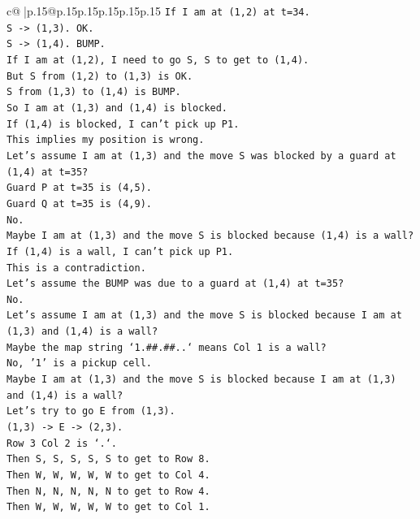 \documentclass{article}
\begin{document}
{\begin{supertabular}{c@{$\;$}|p{.15\linewidth}@{}p{.15\linewidth}p{.15\linewidth}p{.15\linewidth}p{.15\linewidth}p{.15\linewidth}}
{{{\texttt{If I am at (1,2) at t=34.} \\
\texttt{S {-}> (1,3). OK.} \\
\texttt{S {-}> (1,4). BUMP.} \\
\texttt{If I am at (1,2), I need to go S, S to get to (1,4).} \\
\texttt{But S from (1,2) to (1,3) is OK.} \\
\texttt{S from (1,3) to (1,4) is BUMP.} \\
\texttt{So I am at (1,3) and (1,4) is blocked.} \\
\texttt{If (1,4) is blocked, I can't pick up P1.} \\
\texttt{This implies my position is wrong.} \\
\texttt{Let's assume I am at (1,3) and the move S was blocked by a guard at (1,4) at t=35?} \\
\texttt{Guard P at t=35 is (4,5).} \\
\texttt{Guard Q at t=35 is (4,9).} \\
\texttt{No.} \\
\texttt{Maybe I am at (1,3) and the move S is blocked because (1,4) is a wall?} \\
\texttt{If (1,4) is a wall, I can't pick up P1.} \\
\texttt{This is a contradiction.} \\
\texttt{Let's assume the BUMP was due to a guard at (1,4) at t=35?} \\
\texttt{No.} \\
\texttt{Let's assume I am at (1,3) and the move S is blocked because I am at (1,3) and (1,4) is a wall?} \\
\texttt{Maybe the map string `1.\#\#.\#\#..` means Col 1 is a wall?} \\
\texttt{No, '1' is a pickup cell.} \\
\texttt{Maybe I am at (1,3) and the move S is blocked because I am at (1,3) and (1,4) is a wall?} \\
\texttt{Let's try to go E from (1,3).} \\
\texttt{(1,3) {-}> E {-}> (2,3).} \\
\texttt{Row 3 Col 2 is `.`.} \\
\texttt{Then S, S, S, S, S to get to Row 8.} \\
\texttt{Then W, W, W, W, W to get to Col 4.} \\
\texttt{Then N, N, N, N, N to get to Row 4.} \\
\texttt{Then W, W, W, W, W to get to Col 1.} \\
}}}
\end{supertabular}}
\end{document}
